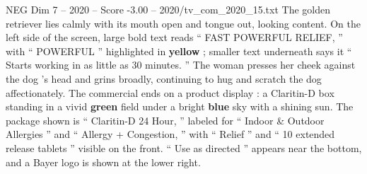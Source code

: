 \begin{textsample}{NEG Dim 7 – 2020 – Score -3.00 – 2020/tv\_com\_2020\_15.txt}
The golden retriever lies calmly with its mouth open and tongue out, looking content.
On the left side of the screen, large bold text reads “ FAST POWERFUL RELIEF, ” with “ POWERFUL ” highlighted in \textbf{yellow} ; smaller text underneath says it “ Starts working in as little as 30 minutes. ” The woman presses her cheek against the dog ’s head and grins broadly, continuing to hug and scratch the dog affectionately.
The commercial ends on a product display : a Claritin-D box standing in a vivid \textbf{green} field under a bright \textbf{blue} sky with a shining sun.
The package shown is “ Claritin-D 24 Hour, ” labeled for “ Indoor \& Outdoor Allergies ” and “ Allergy + Congestion, ” with “ Relief ” and “ 10 extended release tablets ” visible on the front. “ Use as directed ” appears near the bottom, and a Bayer logo is shown at the lower right.

\end{textsample}
